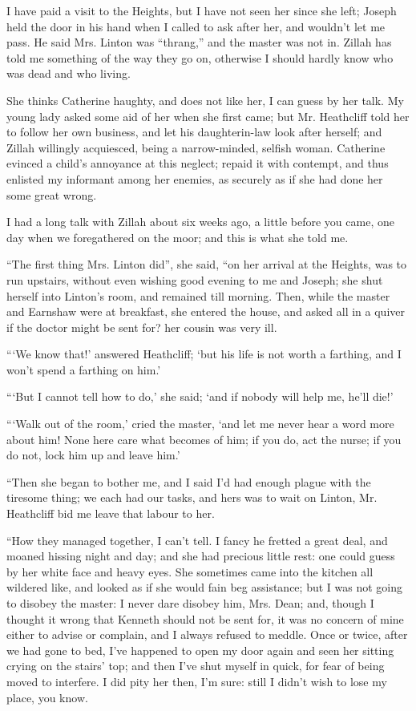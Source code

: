 \par I have paid a visit to the Heights, but I have not seen her since she left; Joseph held the door in his hand when I called to ask after her, and wouldn't let me pass. He said Mrs. Linton was “thrang,” and the master was not in. Zillah has told me something of the way they go on, otherwise I should hardly know who was dead and who living.
\par She thinks Catherine haughty, and does not like her, I can guess by her talk. My young lady asked some aid of her when she first came; but Mr. Heathcliff told her to follow her own business, and let his daughterin-law look after herself; and Zillah willingly acquiesced, being a narrow-minded, selfish woman. Catherine evinced a child's annoyance at this neglect; repaid it with contempt, and thus enlisted my informant among her enemies, as securely as if she had done her some great wrong.
\par I had a long talk with Zillah about six weeks ago, a little before you came, one day when we foregathered on the moor; and this is what she told me.
\par “The first thing Mrs. Linton did”, she said, “on her arrival at the Heights, was to run upstairs, without even wishing good evening to me and Joseph; she shut herself into Linton's room, and remained till morning. Then, while the master and Earnshaw were at breakfast, she entered the house, and asked all in a quiver if the doctor might be sent for? her cousin was very ill.
\par “‘We know that!’ answered Heathcliff; ‘but his life is not worth a farthing, and I won't spend a farthing on him.’
\par “‘But I cannot tell how to do,’ she said; ‘and if nobody will help me, he'll die!’
\par “‘Walk out of the room,’ cried the master, ‘and let me never hear a word more about him! None here care what becomes of him; if you do, act the nurse; if you do not, lock him up and leave him.’
\par “Then she began to bother me, and I said I'd had enough plague with the tiresome thing; we each had our tasks, and hers was to wait on Linton, Mr. Heathcliff bid me leave that labour to her.
\par “How they managed together, I can't tell. I fancy he fretted a great deal, and moaned hissing night and day; and she had precious little rest: one could guess by her white face and heavy eyes. She sometimes came into the kitchen all wildered like, and looked as if she would fain beg assistance; but I was not going to disobey the master: I never dare disobey him, Mrs. Dean; and, though I thought it wrong that Kenneth should not be sent for, it was no concern of mine either to advise or complain, and I always refused to meddle. Once or twice, after we had gone to bed, I've happened to open my door again and seen her sitting crying on the stairs' top; and then I've shut myself in quick, for fear of being moved to interfere. I did pity her then, I'm sure: still I didn't wish to lose my place, you know.
